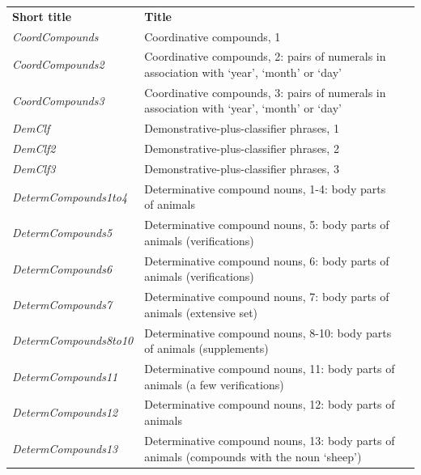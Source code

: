 \begin{table}[H]
  {\renewcommand{\arraystretch}{1.35}
    \begin{tabularx}{\textwidth}{ @{}l Q >{\raggedleft\arraybackslash}P{20mm}}
  \textbf{Short title} & \textbf{Title} &  \\  
      \textit{CoordCompounds} & Coordinative compounds, 1 &  \\
      \textit{CoordCompounds2} & Coordinative compounds, 2: pairs of numerals in association with ‘year', ‘month' or ‘day' &  \\
      \textit{CoordCompounds3} & Coordinative compounds, 3: pairs of numerals in association with ‘year', ‘month' or ‘day' &  \\
      \textit{DemClf} & Demonstrative-plus-classifier phrases, 1 &  \\
      \textit{DemClf2} & Demonstrative-plus-classifier phrases, 2 &  \\
      \textit{DemClf3} & Demonstrative-plus-classifier phrases, 3 &  \\
      \textit{DetermCompounds1to4} & Determinative compound nouns, 1-4: body parts of animals &  \\
      \textit{DetermCompounds5} & Determinative compound nouns, 5: body parts of animals (verifications) &  \\
      \textit{DetermCompounds6} & Determinative compound nouns, 6: body parts of animals (verifications) &  \\
      \textit{DetermCompounds7} & Determinative compound nouns, 7: body parts of animals (extensive set) &  \\
      \textit{DetermCompounds8to10} & Determinative compound nouns, 8-10: body parts of animals (supplements) &  \\
      \textit{DetermCompounds11} & Determinative compound nouns, 11: body parts of animals (a few verifications) &  \\
      \textit{DetermCompounds12} & Determinative compound nouns, 12: body parts of animals &  \\
      \textit{DetermCompounds13} & Determinative compound nouns, 13: body parts of animals (compounds with the noun ‘sheep') &  \\
    \end{tabularx}}
  \end{table}
      

